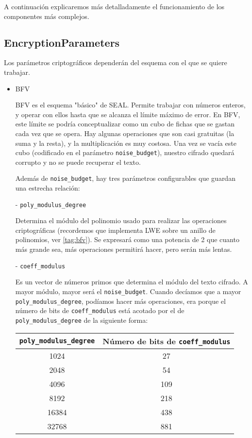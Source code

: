 A continuación explicaremos más detalladamente el funcionamiento de los componentes más complejos.

\subsection{EncryptionParameters}

Los parámetros criptográficos dependerán del esquema con el que se quiere trabajar.

\begin{itemize}

  \item BFV

  BFV es el esquema "básico" de SEAL. Permite trabajar con números enteros, y operar con ellos hasta que se alcanza el límite máximo de error. En BFV, este límite se podría conceptualizar como un cubo de fichas que se gastan cada vez que se opera. Hay algunas operaciones que son casi gratuitas (la suma y la resta), y la multiplicación es muy costosa. Una vez se vacía este cubo (codificado en el parámetro \verb|noise_budget|), nuestro cifrado quedará corrupto y no se puede recuperar el texto.


  Además de \verb|noise_budget|, hay tres parámetros configurables que guardan una estrecha relación:

  - \verb|poly_modulus_degree|

  Determina el módulo del polinomio usado para realizar las operaciones criptográficas (recordemos que implementa LWE sobre un anillo de polinomios, ver \ref{tag:bfv}). Se expresará como una potencia de 2 que cuanto más grande sea, más operaciones permitirá hacer, pero serán más lentas.

  - \verb|coeff_modulus|

  Es un vector de números primos que determina el módulo del texto cifrado. A mayor módulo, mayor será el \verb|noise_budget|. Cuando decíamos que a mayor \verb|poly_modulus_degree|, podíamos hacer más operaciones, era porque el número de bits de \verb|coeff_modulus| está acotado por el de \verb|poly_modulus_degree| de la siguiente forma:

  \begin{tabular}{ | c | c | }
    \verb|poly_modulus_degree|  & Número de bits de \verb|coeff_modulus| \\
    \hline
    1024  & 27  \\
    2048  & 54  \\
    4096  & 109 \\
    8192  & 218 \\
    16384 & 438 \\
    32768 & 881
  \end{tabular}


\end{itemize}
